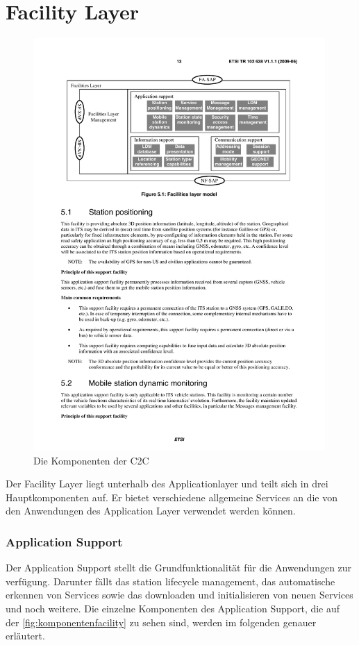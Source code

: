 \chapter{Facility Layer \label{chap:facilitylayer}}
\begin{figure}[htbp]
\includegraphics[width=0.99\textwidth]{content/images/04_facilitylayer/facility_layer_model.pdf}
\caption{Die Komponenten der \acl{C2C}}
\label{fig:komponentenfacility}
\end{figure}
Der Facility Layer liegt unterhalb des Applicationlayer und teilt sich in drei Hauptkomponenten auf. Er bietet verschiedene allgemeine Services an die von den Anwendungen des Application Layer verwendet werden können.

\subsection{Application Support}
Der Application Support stellt die Grundfunktionalität für die Anwendungen zur verfügung. Darunter fällt das station lifecycle management, das automatische erkennen von Services sowie das downloaden und initialisieren von neuen Services und noch weitere. Die einzelne Komponenten des Application Support, die auf der \autoref{fig:komponentenfacility} zu sehen sind, werden im folgenden genauer erläutert. 


